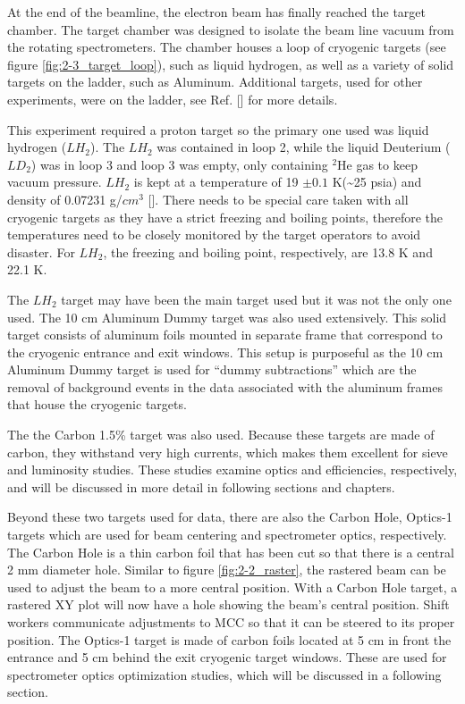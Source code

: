 \documentclass[
]{report}
\begin{document}
\label{Chapter-2-3}

At the end of the beamline, the electron beam has finally reached the
target chamber. The target chamber was designed to isolate the beam line
vacuum from the rotating spectrometers. The chamber houses a loop of
cryogenic targets (see figure \ref{fig:2-3_target_loop}), such as liquid
hydrogen, as well as a variety of solid targets on the ladder, such as
Aluminum. Additional targets, used for other experiments, were on the
ladder, see Ref. {[}\cite{sta_jeerson_2019}{]} for more details.



This experiment required a proton target so the primary one used was
liquid hydrogen (\(LH_2\)). The \(LH_2\) was contained in loop 2, while
the liquid Deuterium (\(LD_2\)) was in loop 3 and loop 3 was empty, only
containing \(^{2}\mathrm{He}\) gas to keep vacuum pressure. \(LH_2\) is
kept at a temperature of 19 \(\pm 0.1\) K(\textasciitilde25 psia) and
density of 0.07231 g/\(cm^3\) {[}\cite{smith_g_hall_2016}{]}. There
needs to be special care taken with all cryogenic targets as they have a
strict freezing and boiling points, therefore the temperatures need to
be closely monitored by the target operators to avoid disaster. For
\(LH_2\), the freezing and boiling point, respectively, are 13.8 K and
22.1 K.

The \(LH_2\) target may have been the main target used but it was not
the only one used. The 10 cm Aluminum Dummy target was also used
extensively. This solid target consists of aluminum foils mounted in
separate frame that correspond to the cryogenic entrance and exit
windows. This setup is purposeful as the 10 cm Aluminum Dummy target is
used for ``dummy subtractions'' which are the removal of background
events in the data associated with the aluminum frames that house the
cryogenic targets.

The the Carbon 1.5\% target was also used. Because these targets are
made of carbon, they withstand very high currents, which makes them
excellent for sieve and luminosity studies. These studies examine optics
and efficiencies, respectively, and will be discussed in more detail in
following sections and chapters.

Beyond these two targets used for data, there are also the Carbon Hole,
Optics-1 targets which are used for beam centering and spectrometer
optics, respectively. The Carbon Hole is a thin carbon foil that has
been cut so that there is a central 2 mm diameter hole. Similar to
figure \ref{fig:2-2_raster}, the rastered beam can be used to adjust the
beam to a more central position. With a Carbon Hole target, a rastered
XY plot will now have a hole showing the beam's central position. Shift
workers communicate adjustments to MCC so that it can be steered to its
proper position. The Optics-1 target is made of carbon foils located at
5 cm in front the entrance and 5 cm behind the exit cryogenic target
windows. These are used for spectrometer optics optimization studies,
which will be discussed in a following section.
\end{document}

